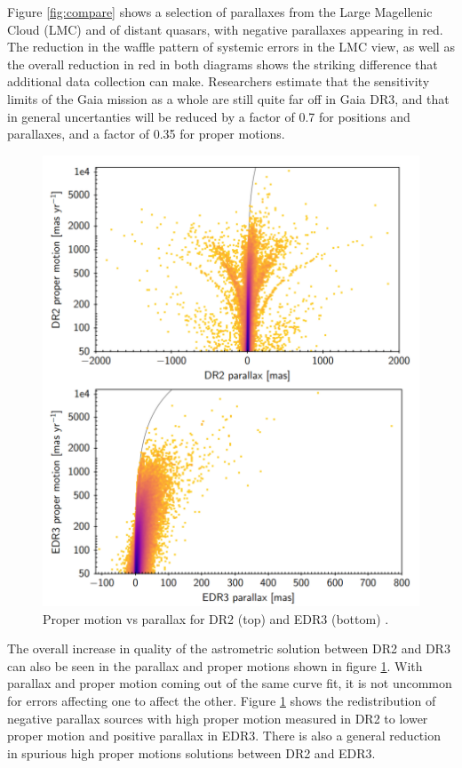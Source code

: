 \documentclass[preprint2]{aastex631}
\begin{document}
Figure \ref{fig:compare} shows a selection of parallaxes from the Large Magellenic Cloud (LMC) and of distant quasars, with negative parallaxes appearing in red. The reduction in the waffle pattern of systemic errors in the LMC view, as well as the overall reduction in red in both diagrams shows the striking difference that additional data collection can make. Researchers estimate that the sensitivity limits of the Gaia mission as a whole are still quite far off in Gaia DR3, and that in general uncertanties will be reduced by a factor of 0.7 for positions and parallaxes, and a factor of 0.35 for proper motions\citep{lindegrenGaia2021a}. 
\begin{figure}
	\includegraphics[width=\columnwidth]{parallaxvspropermotiondr2edr3crop.png}
	\caption{Proper motion vs parallax for DR2 (top) and EDR3 (bottom) \cite{fabriciusGaia2021}.}
	\label{fig:comparepm}
\end{figure}

The overall increase in quality of the astrometric solution between DR2 and DR3 can also be seen in the parallax and proper motions shown in figure \ref{fig:comparepm}. With parallax and proper motion coming out of the same curve fit, it is not uncommon for errors affecting one to affect the other. Figure \ref{fig:comparepm} shows the redistribution of negative parallax sources with high proper motion measured in DR2 to lower proper motion and positive parallax in EDR3. There is also a general reduction in spurious high proper motions solutions between DR2 and EDR3.
\end{document}
